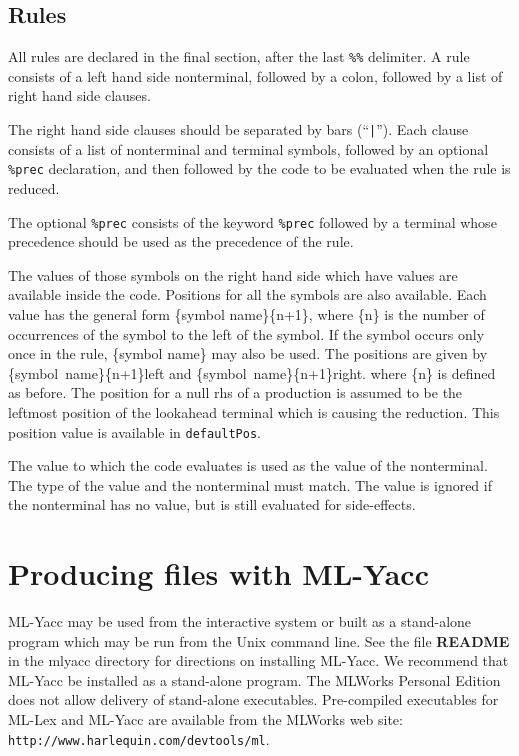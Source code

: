 \documentclass{article}
\begin{document}
\subsection{Rules}

All rules are declared in the final section, after the last {\tt \%\%}
delimiter.  A rule consists of a left hand side nonterminal, followed by
a colon, followed by a list of right hand side clauses. 

The right hand side clauses should be separated by bars (``{\tt |}'').  Each
clause consists of a list of nonterminal and terminal symbols, followed
by an optional {\tt \%prec} declaration, and then followed by the code to be
evaluated when the rule is reduced.

The optional {\tt \%prec} consists of the keyword {\tt \%prec} followed by a 
terminal whose precedence should be used as the precedence of the
rule.

The values of those symbols on the right hand side which have values are 
available inside the code.  Positions for all the symbols are also
available.
Each value has the general form \{symbol name\}\{n+1\}, where \{n\} is the 
number of occurrences of the symbol to the left of the symbol.  If
the symbol occurs only once in the rule, \{symbol name\} may also 
be used.
The positions are given by \{symbol~name\}\{n+1\}left and
\{symbol~name\}\{n+1\}right.  where \{n\} is defined as before.
The position for a null rhs of
a production is assumed to be the leftmost position of the lookahead
terminal which is causing the reduction. This position value is
available in {\tt defaultPos}.

The value to which the code evaluates is used as the value of the
nonterminal.  The type of the value and the nonterminal must match.
The value is ignored if the nonterminal has no value, but is still
evaluated for side-effects.

\section{Producing files with ML-Yacc}

ML-Yacc may be used from the interactive system or built as a
stand-alone program which may be run from the Unix command line.
See the file {\bf README} in the mlyacc directory for directions
on installing ML-Yacc.  We recommend that ML-Yacc be installed as
a stand-alone program.  The MLWorks Personal Edition does
not allow delivery of stand-alone executables.  Pre-compiled 
executables for ML-Lex and ML-Yacc are available from the MLWorks
web site: {\tt http://www.harlequin.com/devtools/ml}.
\end{document}
